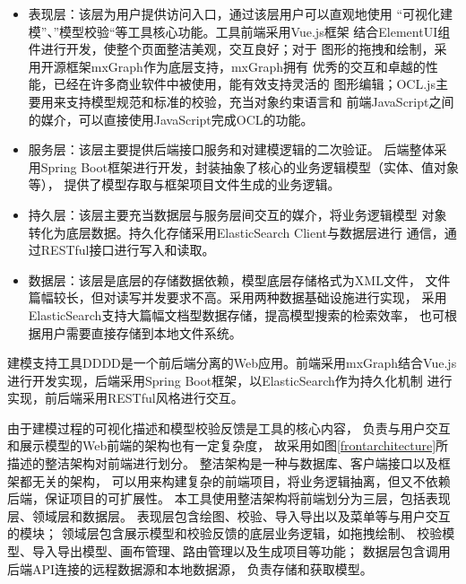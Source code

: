 \begin{itemize}
    \item 表现层：该层为用户提供访问入口，通过该层用户可以直观地使用
    “可视化建模”、”模型校验“等工具核心功能。工具前端采用Vue.js框架
    结合ElementUI组件进行开发，使整个页面整洁美观，交互良好；对于
    图形的拖拽和绘制，采用开源框架mxGraph作为底层支持，mxGraph拥有
    优秀的交互和卓越的性能，已经在许多商业软件中被使用，能有效支持灵活的
    图形编辑；OCL.js主要用来支持模型规范和标准的校验，充当对象约束语言和
    前端JavaScript之间的媒介，可以直接使用JavaScript完成OCL的功能。
    \item 服务层：该层主要提供后端接口服务和对建模逻辑的二次验证。
    后端整体采用Spring Boot框架进行开发，封装抽象了核心的业务逻辑模型（实体、值对象等），
    提供了模型存取与框架项目文件生成的业务逻辑。
    \item 持久层：该层主要充当数据层与服务层间交互的媒介，将业务逻辑模型
    对象转化为底层数据。持久化存储采用ElasticSearch Client与数据层进行
    通信，通过RESTful接口进行写入和读取。
    \item 数据层：该层是底层的存储数据依赖，模型底层存储格式为XML文件，
    文件篇幅较长，但对读写并发要求不高。采用两种数据基础设施进行实现，
    采用ElasticSearch支持大篇幅文档型数据存储，提高模型搜索的检索效率，
    也可根据用户需要直接存储到本地文件系统。
\end{itemize}

建模支持工具DDDD是一个前后端分离的Web应用。前端采用mxGraph结合Vue.js
进行开发实现，后端采用Spring Boot框架，以ElasticSearch作为持久化机制
进行实现，前后端采用RESTful风格进行交互\cite{richardson2008restful}。

由于建模过程的可视化描述和模型校验反馈是工具的核心内容，
负责与用户交互和展示模型的Web前端的架构也有一定复杂度，
故采用如图\ref{frontarchitecture}所描述的整洁架构\cite{martin2018clean}对前端进行划分。
整洁架构是一种与数据库、客户端接口以及框架都无关的架构，
可以用来构建复杂的前端项目，将业务逻辑抽离，但又不依赖后端，保证项目的可扩展性。
本工具使用整洁架构将前端划分为三层，包括表现层、领域层和数据层。
表现层包含绘图、校验、导入导出以及菜单等与用户交互的模块；
领域层包含展示模型和校验反馈的底层业务逻辑，如拖拽绘制、
校验模型、导入导出模型、画布管理、路由管理以及生成项目等功能；
数据层包含调用后端API连接的远程数据源和本地数据源，
负责存储和获取模型。

